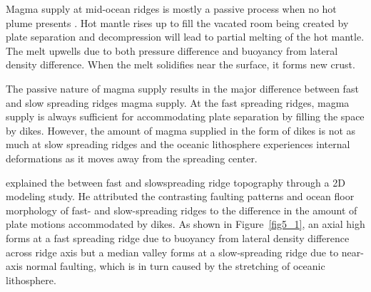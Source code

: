 \documentclass[12pt]{article}
\begin{document}
Magma supply at mid-ocean ridges is mostly a passive process when no hot plume presents \citep{Fowler2004}. Hot mantle rises up  to fill the vacated room being created by plate separation and decompression will lead to partial melting of the hot mantle. The melt upwells  due to both pressure difference and buoyancy from lateral density difference. When the melt solidifies near the surface, it forms new crust. 

The passive nature of magma supply results in the major difference between fast and slow spreading ridges  magma supply. At the fast spreading ridges, magma supply is always sufficient for accommodating plate separation by filling the space by dikes. However, the amount of magma supplied in the form of dikes is not as much at slow spreading ridges and the oceanic lithosphere experiences internal deformations as it moves away from the spreading center. 

 explained the  between fast\add[EC]{-} and slow\add[EC]{-}spreading ridge topography through a 2D modeling study. He attributed the contrasting faulting patterns and ocean floor morphology of fast- and slow-spreading ridges to the difference in the amount of plate motions accommodated by dikes. As shown in Figure~\ref{fig5_1}, an axial high forms at a fast spreading ridge due to buoyancy from lateral density difference across ridge axis but a median valley forms at a slow-spreading ridge due to near-axis normal faulting, which is in turn caused by the stretching of oceanic lithosphere.
\end{document}
